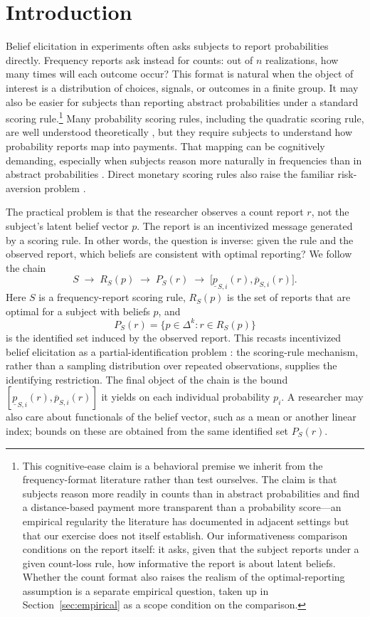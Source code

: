 \section{Introduction}

Belief elicitation in experiments often asks subjects to report probabilities directly.
Frequency reports ask instead for counts: out of \(n\) realizations, how many times will each outcome occur?
This format is natural when the object of interest is a distribution of choices, signals, or outcomes in a finite group.
It may also be easier for subjects than reporting abstract probabilities under a standard scoring rule.\footnote{This cognitive-ease claim is a behavioral premise we inherit from the frequency-format literature \citep{Hogarth1975,GigerenzerHoffrage1995} rather than test ourselves. The claim is that subjects reason more readily in counts than in abstract probabilities and find a distance-based payment more transparent than a probability score---an empirical regularity the literature has documented in adjacent settings but that our exercise does not itself establish. Our informativeness comparison conditions on the report itself: it asks, given that the subject reports under a given count-loss rule, how informative the report is about latent beliefs. Whether the count format also raises the realism of the optimal-reporting assumption is a separate empirical question, taken up in Section~\ref{sec:empirical} as a scope condition on the comparison.}
Many probability scoring rules, including the quadratic scoring rule, are well understood theoretically \citep{Savage1971,GneitingRaftery2007,Selten1998}, but they require subjects to understand how probability reports map into payments.
That mapping can be cognitively demanding, especially when subjects reason more naturally in frequencies than in abstract probabilities \citep{Hogarth1975,GigerenzerHoffrage1995,SchlagEtAl2013}.
Direct monetary scoring rules also raise the familiar risk-aversion problem \citep{ArmantierTreich2012}.

The practical problem is that the researcher observes a count report \(r\), not the subject's latent belief vector \(p\).
The report is an incentivized message generated by a scoring rule.
In other words, the question is inverse: given the rule and the observed report, which beliefs are consistent with optimal reporting?
We follow the chain
\[
S
\;\rightarrow\;
R_S(p)
\;\rightarrow\;
P_S(r)
\;\rightarrow\;
\bigl[\underline p_{S,i}(r),\overline p_{S,i}(r)\bigr].
\]
Here \(S\) is a frequency-report scoring rule, \(R_S(p)\) is the set of reports that are optimal for a subject with beliefs \(p\), and
\[
P_S(r)=\{p\in\Delta^k:r\in R_S(p)\}
\]
is the identified set induced by the observed report.
This recasts incentivized belief elicitation as a partial-identification problem \citep{Manski2003}: the scoring-rule mechanism, rather than a sampling distribution over repeated observations, supplies the identifying restriction.
The final object of the chain is the bound \([\underline p_{S,i}(r),\overline p_{S,i}(r)]\) it yields on each individual probability \(p_i\).
A researcher may also care about functionals of the belief vector, such as a mean or another linear index; bounds on these are obtained from the same identified set \(P_S(r)\).

